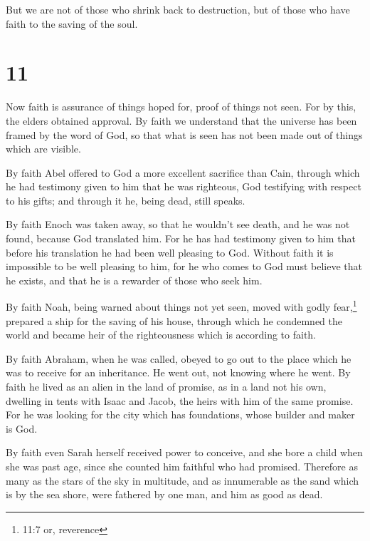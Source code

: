  But we are not of those who shrink back to destruction,
but of those who have faith to the saving of the soul.

\hypertarget{section-10}{%
\section{11}\label{section-10}}

 Now faith is assurance of things hoped for, proof of things
not seen.  For by this, the elders obtained approval.
 By faith we understand that the universe has been framed by
the word of God, so that what is seen has not been made out of things
which are visible.

 By faith Abel offered to God a more excellent sacrifice
than Cain, through which he had testimony given to him that he was
righteous, God testifying with respect to his gifts; and through it he,
being dead, still speaks.

 By faith Enoch was taken away, so that he wouldn't see
death, and he was not found, because God translated him. For he has had
testimony given to him that before his translation he had been well
pleasing to God.  Without faith it is impossible to be well
pleasing to him, for he who comes to God must believe that he exists,
and that he is a rewarder of those who seek him.

 By faith Noah, being warned about things not yet seen,
moved with godly fear,\footnote{11:7 or, reverence} prepared a ship for
the saving of his house, through which he condemned the world and became
heir of the righteousness which is according to faith.

 By faith Abraham, when he was called, obeyed to go out to
the place which he was to receive for an inheritance. He went out, not
knowing where he went.  By faith he lived as an alien in the
land of promise, as in a land not his own, dwelling in tents with Isaac
and Jacob, the heirs with him of the same promise.  For he
was looking for the city which has foundations, whose builder and maker
is God.

 By faith even Sarah herself received power to conceive,
and she bore a child when she was past age, since she counted him
faithful who had promised.  Therefore as many as the stars
of the sky in multitude, and as innumerable as the sand which is by the
sea shore, were fathered by one man, and him as good as dead.

